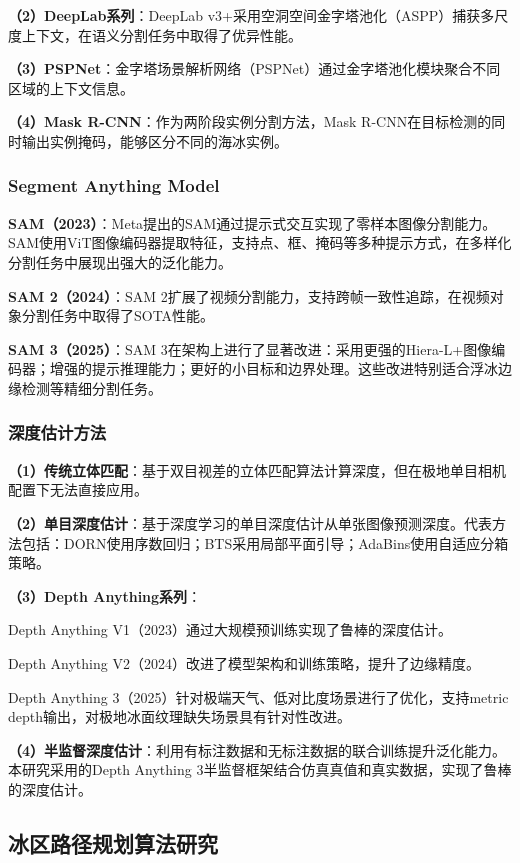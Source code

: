 \documentclass[12pt,a4paper]{ctexbook}
\begin{document}
\textbf{（2）DeepLab系列}：DeepLab v3+采用空洞空间金字塔池化（ASPP）捕获多尺度上下文，在语义分割任务中取得了优异性能。

\textbf{（3）PSPNet}：金字塔场景解析网络（PSPNet）通过金字塔池化模块聚合不同区域的上下文信息。

\textbf{（4）Mask R-CNN}：作为两阶段实例分割方法，Mask R-CNN在目标检测的同时输出实例掩码，能够区分不同的海冰实例。

\subsubsection{Segment Anything Model}

\textbf{SAM（2023）}：Meta提出的SAM通过提示式交互实现了零样本图像分割能力。SAM使用ViT图像编码器提取特征，支持点、框、掩码等多种提示方式，在多样化分割任务中展现出强大的泛化能力。

\textbf{SAM 2（2024）}：SAM 2扩展了视频分割能力，支持跨帧一致性追踪，在视频对象分割任务中取得了SOTA性能。

\textbf{SAM 3（2025）}：SAM 3在架构上进行了显著改进：采用更强的Hiera-L+图像编码器；增强的提示推理能力；更好的小目标和边界处理。这些改进特别适合浮冰边缘检测等精细分割任务。

\subsubsection{深度估计方法}

\textbf{（1）传统立体匹配}：基于双目视差的立体匹配算法计算深度，但在极地单目相机配置下无法直接应用。

\textbf{（2）单目深度估计}：基于深度学习的单目深度估计从单张图像预测深度。代表方法包括：DORN使用序数回归；BTS采用局部平面引导；AdaBins使用自适应分箱策略。

\textbf{（3）Depth Anything系列}：

Depth Anything V1（2023）通过大规模预训练实现了鲁棒的深度估计。

Depth Anything V2（2024）改进了模型架构和训练策略，提升了边缘精度。

Depth Anything 3（2025）针对极端天气、低对比度场景进行了优化，支持metric depth输出，对极地冰面纹理缺失场景具有针对性改进。

\textbf{（4）半监督深度估计}：利用有标注数据和无标注数据的联合训练提升泛化能力。本研究采用的Depth Anything 3半监督框架结合仿真真值和真实数据，实现了鲁棒的深度估计。

\subsection{冰区路径规划算法研究}
\end{document}
